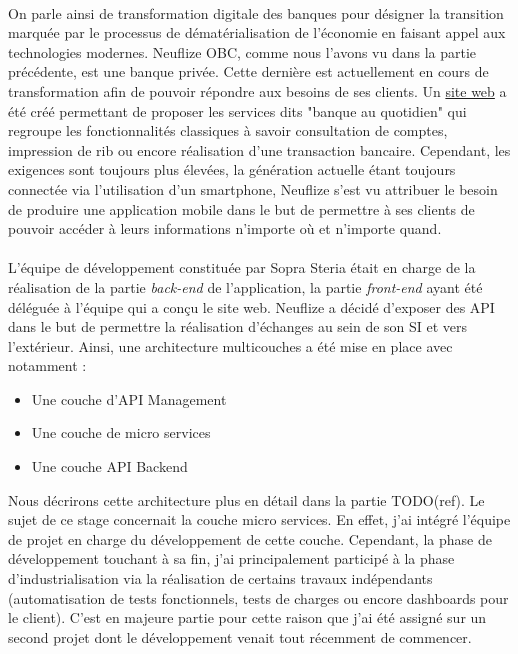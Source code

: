 \paragraph{}
On parle ainsi de transformation digitale des banques pour désigner la transition marquée par le processus de dématérialisation de l'économie en faisant appel aux technologies modernes. Neuflize OBC, comme nous l'avons vu dans la partie précédente, est une banque privée. Cette dernière est actuellement en cours de transformation afin de pouvoir répondre aux besoins de ses clients. Un \href{https://www.neuflizeobc.net/portail/portail.jsp}{site web} a été créé permettant de proposer les services dits "banque au quotidien" qui regroupe les fonctionnalités classiques à savoir consultation de comptes, impression de rib ou encore réalisation d'une transaction bancaire. Cependant, les exigences sont toujours plus élevées, la génération actuelle étant toujours connectée via l'utilisation d'un smartphone, Neuflize s'est vu attribuer le besoin de produire une application mobile dans le but de permettre à ses clients de pouvoir accéder à leurs informations n'importe où et n'importe quand.

\paragraph{}
L'équipe de développement constituée par Sopra Steria était en charge de la réalisation de la partie \textit{back-end} de l'application, la partie \textit{front-end} ayant été déléguée à l'équipe qui a conçu le site web. Neuflize a décidé d'exposer des API dans le but de permettre la réalisation d'échanges au sein de son SI et vers l'extérieur. Ainsi, une architecture multicouches a été mise en place avec notamment : \\

\begin{itemize}
	\item Une couche d'API Management
	\item Une couche de micro services
	\item Une couche API Backend \\
\end{itemize} 

Nous décrirons cette architecture plus en détail dans la partie TODO(ref). Le sujet de ce stage concernait la couche micro services. En effet, j'ai intégré l'équipe de projet en charge du développement de cette couche. Cependant, la phase de développement touchant à sa fin, j'ai principalement participé à la phase d'industrialisation via la réalisation de certains travaux indépendants (automatisation de tests fonctionnels, tests de charges ou encore dashboards pour le client). C'est en majeure partie pour cette raison que j'ai été assigné sur un second projet dont le développement venait tout récemment de commencer.

\newpage